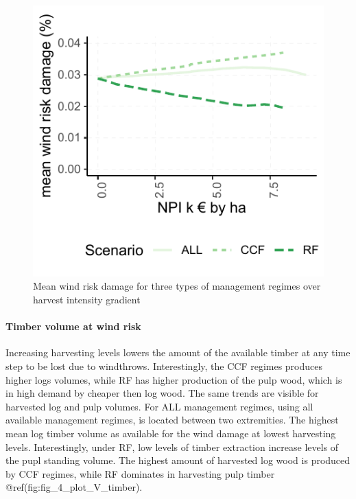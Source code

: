 \documentclass[]{elsarticle} %
\makeatletter
\def\maxwidth{\ifdim\Gin@nat@width>\linewidth\linewidth
\else\Gin@nat@width\fi}
\let\Oldincludegraphics\includegraphics
\renewcommand{\includegraphics}[1]{\Oldincludegraphics[width=\maxwidth]{#1}}
\makeatother
\begin{document}
\begin{figure}
\centering
\includegraphics{test_manus_files/figure-latex/fig3_mean_risk_by_intensity_plot-1.pdf}
\caption{Mean wind risk damage for three types of management regimes
over harvest intensity gradient}
\end{figure}

\paragraph{Timber volume at wind risk}\label{timber-volume-at-wind-risk}

Increasing harvesting levels lowers the amount of the available timber
at any time step to be lost due to windthrows. Interestingly, the CCF
regimes produces higher logs volumes, while RF has higher production of
the pulp wood, which is in high demand by cheaper then log wood. The
same trends are visible for harvested log and pulp volumes. For ALL
management regimes, using all available management regimes, is located
between two extremities. The highest mean log timber volume as available
for the wind damage at lowest harvesting levels. Interestingly, under
RF, low levels of timber extraction increase levels of the pupl standing
volume. The highest amount of harvested log wood is produced by CCF
regimes, while RF dominates in harvesting pulp timber
@ref(fig:fig\_4\_plot\_V\_timber).
\end{document}
